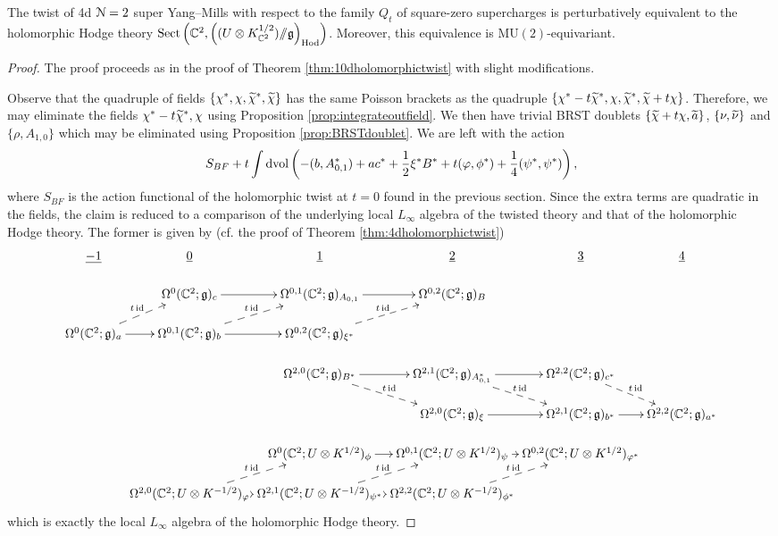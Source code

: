\documentclass[10pt, oneside]{article}
\newcommand{\Hod}{\mathrm{Hod}}
\newcommand{\MU}{\mathrm{MU}}
\newcommand{\Sect}{\mathrm{Sect}}
\newcommand{\ham}{/\!\!/}
\begin{document}
\begin{theorem}
The twist of 4d $\mathcal N=2$ super Yang--Mills with respect to the family $Q_t$ of square-zero supercharges is perturbatively equivalent to the holomorphic Hodge theory $\Sect\left(\CC^2, \left((U\otimes K_{\CC^2}^{1/2})\ham \fg\right)_{\Hod}\right)$. Moreover, this equivalence is $\MU(2)$-equivariant.
\label{thm:4dDonaldsontwist}
\end{theorem}
\begin{proof}
The proof proceeds as in the proof of Theorem \ref{thm:10dholomorphictwist} with slight modifications.

Observe that the quadruple of fields $\{\chi^*, \chi, \widetilde{\chi}^*, \widetilde{\chi}\}$ has the same Poisson brackets as the quadruple $\{\chi^*-t\widetilde{\chi}^*, \chi, \widetilde{\chi}^*, \widetilde{\chi} + t\chi\}$. Therefore, we may eliminate the fields $\chi^*-t\widetilde{\chi}^*, \chi$ using Proposition \ref{prop:integrateoutfield}. We then have trivial BRST doublets $\{\widetilde{\chi} + t\chi, \widetilde{a}\}$, $\{\nu, \widetilde{\nu}\}$ and $\{\rho, A_{1, 0}\}$ which may be eliminated using Proposition \ref{prop:BRSTdoublet}. We are left with the action
\[S_{BF} + t \int\operatorname{dvol}\left(-(b, A_{0, 1}^*) + a c^* + \frac{1}{2} \xi^* B^* + t (\varphi, \phi^*) + \frac 14 (\psi^*, \psi^*) \right),\]
where $S_{BF}$ is the action functional of the holomorphic twist at $t=0$ found in the previous section. 
Since the extra terms are quadratic in the fields, the claim is reduced to a comparison of the underlying local $L_\infty$ algebra of the twisted theory and that of the holomorphic Hodge theory. The former is given by (cf. the proof of Theorem \ref{thm:4dholomorphictwist})
\[
\xymatrix@R=0.5cm@C=0cm{
\ul{-1} & \ul{0} & \ul{1} & \ul{2} & \ul{3} & \ul{4} \\ 
& \Omega^0(\CC^2; \gg)_c \ar[r] &\Omega^{0,1}(\CC^2; \gg)_{A_{0,1}} \ar[r] &\Omega^{0,2}(\CC^2; \gg)_{B} \\
\Omega^0(\CC^2; \gg)_a  \ar@{-->}^{t\id}[ur] \ar[r] &\Omega^{0,1}(\CC^2; \gg)_{b}  \ar@{-->}^{t\id}[ur] \ar[r] &\Omega^{0,2}(\CC^2; \gg)_{\xi^*}  \ar@{-->}^{t\id}[ur] \\
& &  \Omega^{2,0}(\CC^2 ; \gg)_{B^*}  \ar@{-->}^{t\id}[dr] \ar[r] & \Omega^{2,1}(\CC^2 ; \gg)_{A_{0,1}^*} \ar[r]  \ar@{-->}^{t\id}[dr] & \Omega^{2,2}(\CC^2 ; \gg)_{c^*}  \ar@{-->}^{t\id}[dr] \\
& & & \Omega^{2,0}(\CC^2; \gg)_\xi \ar[r] &\Omega^{2,1}(\CC^2; \gg)_{b^*} \ar[r] &\Omega^{2,2}(\CC^2; \gg)_{a^*}  \\
& & \Omega^0(\CC^2 ; U\otimes K^{1/2})_\phi \ar[r] & \Omega^{0,1}(\CC^2 ; U\otimes K^{1/2})_\psi \ar[r] & \Omega^{0,2}(\CC^2 ; U\otimes K^{1/2})_{\varphi^*} \\
& \Omega^{2,0}(\CC^2 ; U\otimes K^{-1/2})_{\varphi} \ar[r]  \ar@{-->}^{t\id}[ur] & \Omega^{2,1}(\CC^2 ; U\otimes K^{-1/2})_{\psi^*} \ar[r]  \ar@{-->}^{t\id}[ur]  & \Omega^{2,2}(\CC^2 ; U\otimes K^{-1/2})_{\phi^*}  \ar@{-->}^{t\id}[ur]
}
\]
which is exactly the local $L_\infty$ algebra of the holomorphic Hodge theory.
\end{proof}
\end{document}
